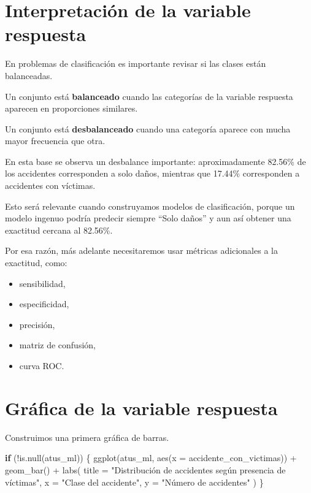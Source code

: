 \documentclass[
  11pt,
  letterpaper,
]{book}
\newenvironment{Shaded}{\begin{snugshade}}{\end{snugshade}}
\newcommand{\AttributeTok}[1]{\textcolor[rgb]{0.40,0.45,0.13}{#1}}
\newcommand{\ControlFlowTok}[1]{\textcolor[rgb]{0.00,0.23,0.31}{\textbf{#1}}}
\newcommand{\FunctionTok}[1]{\textcolor[rgb]{0.28,0.35,0.67}{#1}}
\newcommand{\NormalTok}[1]{\textcolor[rgb]{0.00,0.23,0.31}{#1}}
\newcommand{\SpecialCharTok}[1]{\textcolor[rgb]{0.37,0.37,0.37}{#1}}
\newcommand{\StringTok}[1]{\textcolor[rgb]{0.13,0.47,0.30}{#1}}
\providecommand{\tightlist}{%
  \setlength{\itemsep}{0pt}\setlength{\parskip}{0pt}}
\begin{document}
\section{Interpretación de la variable
respuesta}\label{interpretaciuxf3n-de-la-variable-respuesta}

En problemas de clasificación es importante revisar si las clases están
balanceadas.

Un conjunto está \textbf{balanceado} cuando las categorías de la
variable respuesta aparecen en proporciones similares.

Un conjunto está \textbf{desbalanceado} cuando una categoría aparece con
mucha mayor frecuencia que otra.

En esta base se observa un desbalance importante: aproximadamente
82.56\% de los accidentes corresponden a solo daños, mientras que
17.44\% corresponden a accidentes con víctimas.

Esto será relevante cuando construyamos modelos de clasificación, porque
un modelo ingenuo podría predecir siempre ``Solo daños'' y aun así
obtener una exactitud cercana al 82.56\%.

Por esa razón, más adelante necesitaremos usar métricas adicionales a la
exactitud, como:

\begin{itemize}
\tightlist
\item
  sensibilidad,
\item
  especificidad,
\item
  precisión,
\item
  matriz de confusión,
\item
  curva ROC.
\end{itemize}

\section{Gráfica de la variable
respuesta}\label{gruxe1fica-de-la-variable-respuesta}

Construimos una primera gráfica de barras.

\begin{Shaded}
\begin{Highlighting}[]
\ControlFlowTok{if}\NormalTok{ (}\SpecialCharTok{!}\FunctionTok{is.null}\NormalTok{(atus\_ml)) \{}
  \FunctionTok{ggplot}\NormalTok{(atus\_ml, }\FunctionTok{aes}\NormalTok{(}\AttributeTok{x =}\NormalTok{ accidente\_con\_victimas)) }\SpecialCharTok{+}
    \FunctionTok{geom\_bar}\NormalTok{() }\SpecialCharTok{+}
    \FunctionTok{labs}\NormalTok{(}
      \AttributeTok{title =} \StringTok{"Distribución de accidentes según presencia de víctimas"}\NormalTok{,}
      \AttributeTok{x =} \StringTok{"Clase del accidente"}\NormalTok{,}
      \AttributeTok{y =} \StringTok{"Número de accidentes"}
\NormalTok{    )}
\NormalTok{\}}
\end{Highlighting}
\end{Shaded}
\end{document}
